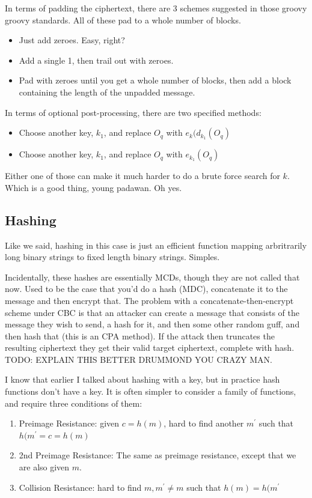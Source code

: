     In terms of padding the ciphertext, there are 3 schemes suggested in those groovy groovy standards. All of these pad to a whole number of blocks.
    \begin{itemize}
        \item Just add zeroes. Easy, right?
        \item Add a single 1, then trail out with zeroes.
        \item Pad with zeroes until you get a whole number of blocks, then add a block containing the length of the unpadded message.
    \end{itemize}

    In terms of optional post-processing, there are two specified methods:
    \begin{itemize}
        \item Choose another key, $k_{1}$, and replace $O_{q}$ with $e_{k}(d_{k_{1}}(O_{q})$
        \item Choose another key, $k_{1}$, and replace $O_{q}$ with $e_{k_{1}}(O_{q})$ 
    \end{itemize}

    Either one of those can make it much harder to do a brute force search for $k$. Which is a good thing, young padawan. Oh yes.

    \subsection{Hashing}
    Like we said, hashing in this case is just an efficient function mapping arbritrarily long binary strings to fixed length binary strings. Simples.

    Incidentally, these hashes are essentially MCDs, though they are not called that now. Used to be the case that you'd do a hash (MDC), concatenate it to the message and then encrypt that. The problem with a concatenate-then-encrypt scheme under CBC is that an attacker can create a message that consists of the message they wish to send, a hash for it, and then some other random guff, and then hash that (this is an CPA method). If the attack then truncates the resulting ciphertext they get their valid target ciphertext, complete with hash. TODO: EXPLAIN THIS BETTER DRUMMOND YOU CRAZY MAN.

    I know that earlier I talked about hashing with a key, but in practice hash functions don't have a key. It is often simpler to consider a family of functions, and require three conditions of them:
    \begin{enumerate}
        \item Preimage Resistance: given $c = h(m)$, hard to find another $m^{'}$ such that $h(m^{'} = c = h(m)$
        \item 2nd Preimage Resistance: The same as preimage resistance, except that we are also given $m$.
        \item Collision Resistance: hard to find $m, m^{'} \neq m$ such that $h(m) = h(m^{'}$
    \end{enumerate}

